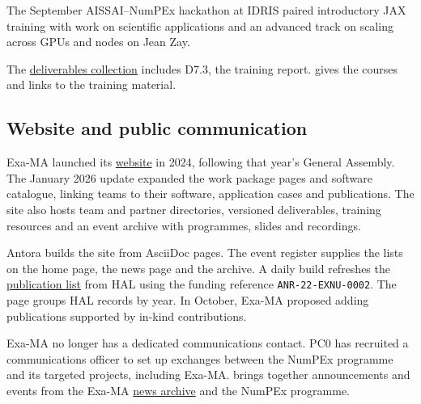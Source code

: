 The September AISSAI--NumPEx hackathon at IDRIS paired introductory
JAX training with work on scientific applications and an advanced
track on scaling across GPUs and nodes on Jean Zay.

\ifdefined\ExaMAStandaloneManagement
The \href{https://exa-ma.numpex.fr/deliverables.html}{deliverables
collection} includes D7.3, the training report.
\else
{} gives the courses and links to the training material.
\fi

\subsection{Website and public communication}

Exa-MA launched its \href{https://exa-ma.numpex.fr/}{website} in 2024,
following that year's General Assembly. The January 2026 update expanded
the work package pages and software catalogue, linking teams to their
software, application cases and publications. The site also hosts team
and partner directories, versioned deliverables, training resources and
an event archive with programmes, slides and recordings.

Antora builds the site from AsciiDoc pages. The event register supplies
the lists on the home page, the news page and the archive. A daily build
refreshes the
\href{https://exa-ma.numpex.fr/publications-hal.html}{publication list}
from HAL using the funding reference \texttt{ANR-22-EXNU-0002}. The page
groups HAL records by year. In October, Exa-MA proposed adding
publications supported by in-kind contributions.

Exa-MA no longer has a dedicated communications contact. PC0 has recruited
a communications officer to set up exchanges between the NumPEx programme
and its targeted projects, including Exa-MA. 
brings together announcements and events from the Exa-MA
\href{https://exa-ma.numpex.fr/news/archive.html}{news archive} and the
NumPEx programme.


